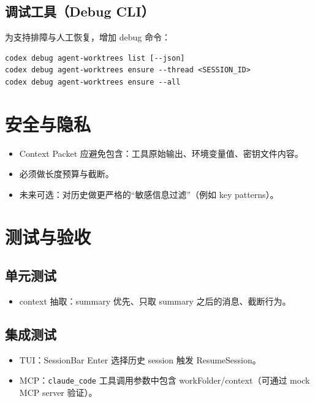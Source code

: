 \documentclass[UTF8,11pt]{ctexart}
\begin{document}
\subsection{调试工具（Debug CLI）}
为支持排障与人工恢复，增加 debug 命令：
\begin{lstlisting}
codex debug agent-worktrees list [--json]
codex debug agent-worktrees ensure --thread <SESSION_ID>
codex debug agent-worktrees ensure --all
\end{lstlisting}

\section{安全与隐私}
\begin{itemize}[nosep]
  \item Context Packet 应避免包含：工具原始输出、环境变量值、密钥文件内容。
  \item 必须做长度预算与截断。
  \item 未来可选：对历史做更严格的“敏感信息过滤”（例如 key patterns）。
\end{itemize}

\section{测试与验收}
\subsection{单元测试}
\begin{itemize}[nosep]
  \item context 抽取：summary 优先、只取 summary 之后的消息、截断行为。
\end{itemize}

\subsection{集成测试}
\begin{itemize}[nosep]
  \item TUI：SessionBar Enter 选择历史 session 触发 ResumeSession。
  \item MCP：\texttt{claude\_code} 工具调用参数中包含 workFolder/context（可通过 mock MCP server 验证）。
\end{itemize}
\end{document}

